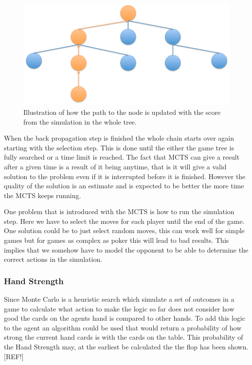 \documentclass[journal]{vgtc}                %
\begin{document}
\begin{figure}[here]
  \begin{center}
    \includegraphics[scale=0.30]{img/tree2.png}
    \caption{\label{fig:backprop} Illustration of how the path to the node is updated with the score from the simulation in the whole tree.}
  \end{center}
\end{figure}
When the back propagation step is finished the whole chain starts over again starting with the selection step. This is done until the either the game tree is fully searched or a time limit is reached. The fact that MCTS can give a result after a given time is a result of it being anytime, that is it will give a valid solution to the problem even if it is interrupted before it is finished. However the quality of the solution is an estimate and is expected to be better the more time the MCTS keeps running.

One problem that is introduced with the MCTS is how to run the simulation step. Here we have to select the moves for each player until the end of the game. One solution could be to just select random moves, this can work well for simple games but for games as complex as poker this will lead to bad results. This implies that we somehow have to model the opponent to be able to determine the correct actions in the simulation.  

\subsubsection{Hand Strength}
Since Monte Carlo is a heuristic search which simulate a set of outcomes in a game to calculate what action to make the logic so far does not consider how good  the cards on the agents hand is compared to other hands. To add this logic to the agent an algorithm could be used that would return a probability of how strong the current hand cards is with the cards on the table. This probability of the Hand Strength may, at the earliest be calculated the the flop has been shown. [REF!]
\end{document}
